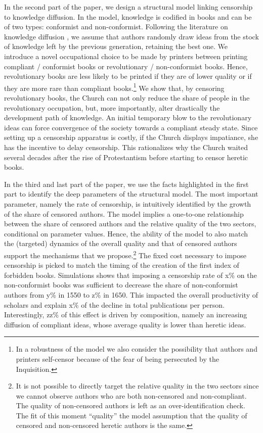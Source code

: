 \documentclass[12pt]{article}
\begin{document}
In the second part of the paper, we design a structural model linking censorship to knowledge diffusion. In the model, knowledge is codified in books and can be of two types: conformist and non-conformist. Following the literature on knowledge diffusion \cite{lucas2009,lucas2014}, we assume that authors randomly draw ideas from the stock of knowledge left by the previous generation, retaining the best one. We introduce a novel occupational choice to be made by printers between printing compliant / conformist books or revolutionary / non-conformist books. Hence, revolutionary books are less likely to be printed if they are of lower quality or if they are more rare than compliant books.\footnote{In a robustness of the model we also consider the possibility that authors and printers self-censor because of the fear of being persecuted by the Inquisition.} We show that, by censoring revolutionary books, the Church can not only reduce the share of people in the revolutionary occupation, but, more importantly, alter drastically the development path of knowledge. An initial temporary blow to the revolutionary ideas can force convergence of the society towards a compliant steady state. Since setting up a censorship apparatus is costly, if the Church displays impatiance, she has the incentive to delay censorship. This rationalizes why the Church waited several decades after the rise of Protestantism before starting to censor heretic books.


In the third and last part of the paper, we use the facts highlighted in the first part to identify the deep parameters of the structural model. The most important parameter, namely the rate of censorship, is intuitively identified by the growth of the share of censored authors. The model implies a one-to-one relationship between the share of censored authors and the relative quality of the two sectors, conditional on parameter values. Hence, the ability of the model to also match the (targeted) dynamics of the overall quality and that of censored authors support the mechanisms that we propose.\footnote{It is not possible to directly target the relative quality in the two sectors since we cannot observe authors who are both non-censored and non-compliant. The quality of non-censored authors is left as an over-identification check. The fit of this moment ``quality'' the model assumption that the quality of censored and non-censored heretic authors is the same.} The fixed cost necessary to impose censorship is picked to match the timing of the creation of the first index of forbidden books. Simulations shows that imposing a censorship rate of x\% on the non-conformist books was sufficient to decrease the share of non-conformist authors from y\% in 1550 to z\% in 1650. This impacted the overall productivity of scholars and explain x\% of the decline in total publications per person. Interestingly, zz\% of this effect is driven by composition, namely an increasing diffusion of compliant ideas, whose average quality is lower than heretic ideas.
\end{document}
